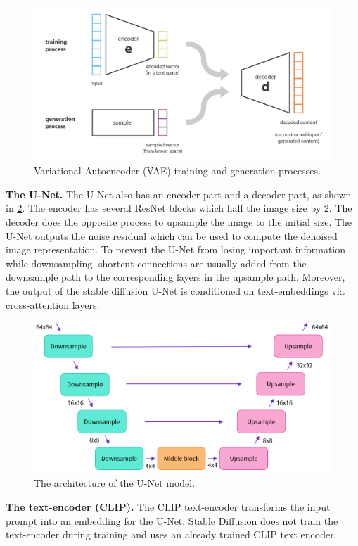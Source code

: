 \begin{figure}[ht]
    \centering
    \includegraphics[width=0.7\linewidth]{images/diffusion/vae.png}
    \caption{Variational Autoencoder (VAE) training and generation processes.}
    \label{fig:vae}
\end{figure}

\textbf{The U-Net.} The U-Net \cite{ronneberger2015u} also has an encoder part and a decoder part, as shown in \cref{fig:unet_model}. The encoder has several ResNet blocks which half the image size by 2. The decoder does the opposite process to upsample the image to the initial size. The U-Net outputs the noise residual which can be used to compute the denoised image representation. To prevent the U-Net from losing important information while downsampling, shortcut connections are usually added from the downsample path to the corresponding layers in the upsample path. Moreover, the output of the stable diffusion U-Net is conditioned on text-embeddings via cross-attention layers.

\begin{figure}[ht]
    \centering
    \includegraphics[width=0.7\linewidth]{images/diffusion/unet-model.png}
    \caption{The architecture of the U-Net model.}
    \label{fig:unet_model}
\end{figure}

\textbf{The text-encoder (CLIP).} The CLIP \cite{radford2021clip} text-encoder transforms the input prompt into an embedding for the U-Net. Stable Diffusion does not train the text-encoder during training and uses an already trained CLIP text encoder.

